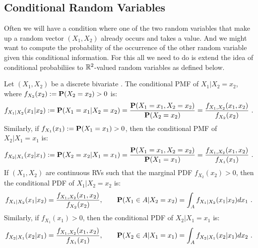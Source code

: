 \subsection{Conditional Random Variables}\label{S:CondRVs}

Often we will have a condition where one of the two random variables that make up a random vector $(X_1,X_2)$ already occurs and takes a value. 
And we might want to compute the probability of the occurrence of the other random variable given this conditional information.
For this all we need to do is extend the idea of conditional probabiliies to $\mathbb{R}^2$-valued random variables as defined below.

\begin{definition}
Let $(X_1,X_2)$ be a discrete bivariate \rv.  The conditional PMF of $X_1|X_2=x_2$, where $f_{X_2}(x_2) := \mathbf{P}(X_2=x_2) > 0$ is:
\[
f_{X_1|X_2}(x_1 | x_2) := \mathbf{P}(X_1=x_1 | X_2=x_2) = \frac{\mathbf{P}(X_1=x_1,X_2=x_2)}{\mathbf{P}(X_2=x_2)} = \frac{f_{X_1,X_2}(x_1,x_2)}{f_{X_2}(x_2)} \ .
\]
Similarly, if $f_{X_1}(x_1) := \mathbf{P}(X_1=x_1) >0$, then the conditional PMF of $X_2|X_1=x_1$ is:
\[
f_{X_2|X_1}(x_2|x_1) := \mathbf{P}(X_2=x_2 | X_1=x_1) = \frac{\mathbf{P}(X_1=x_1,X_2=x_2)}{\mathbf{P}(X_1=x_1)} = \frac{f_{X_1,X_2}(x_1,x_2)}{f_{X_1}(x_1)} \ .
\]
If $(X_1,X_2)$ are continuous RVs such that the marginal PDF $f_{X_2}(x_2)>0$, then the conditional PDF of $X_1|X_2=x_2$ is:
\[
f_{X_1|X_2}(x_1|x_2) = \frac{f_{X_1,X_2}(x_1,x_2)}{f_{X_2}(x_2)}, \qquad \mathbf{P}(X_1 \in A| X_2=x_2) = \int_A f_{X_1|X_2}(x_1|x_2) dx_1 \ .
\]
Similarly, if $f_{X_1}(x_1)>0$, then the conditional PDF of $X_2|X_1=x_1$ is:
\[
f_{X_2|X_1}(x_2|x_1) = \frac{f_{X_1,X_2}(x_1,x_2)}{f_{X_1}(x_1)}, \qquad \mathbf{P}(X_2 \in A| X_1=x_1) = \int_A f_{X_2|X_1}(x_2|x_1) dx_2 \ .
\]
\end{definition}

